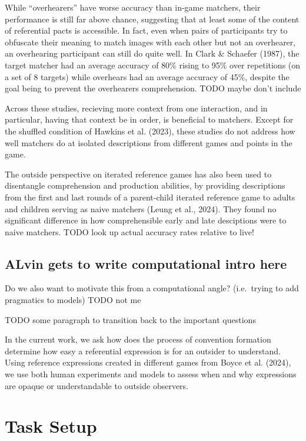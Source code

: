 \documentclass[10pt, letterpaper]{article}
\begin{document}
While ``overhearers'' have worse accuracy than in-game matchers, their
performance is still far above chance, suggesting that at least some of
the content of referential pacts is accessible. In fact, even when pairs
of participants try to obfuscate their meaning to match images with each
other but not an overhearer, an overhearing participant can still do
quite well. In Clark \& Schaefer (1987), the target matcher had an
average accuracy of 80\% rising to 95\% over repetitions (on a set of 8
targets) while overhears had an average accuracy of 45\%, despite the
goal being to prevent the overhearers comprehension. TODO maybe don't
include

Across these studies, recieving more context from one interaction, and
in particular, having that context be in order, is beneficial to
matchers. Except for the shuffled condition of Hawkins et al. (2023),
these studies do not address how well matchers do at isolated
descriptions from different games and points in the game.

The outside perspective on iterated reference games has also been used
to disentangle comprehension and production abilities, by providing
descriptions from the first and last rounds of a parent-child iterated
reference game to adults and children serving as naive matchers (Leung
et al., 2024). They found no significant difference in how
comprehensible early and late desciptions were to naive matchers. TODO
look up actual accuracy rates relative to live!

\subsection{ALvin gets to write computational intro
here}\label{alvin-gets-to-write-computational-intro-here}

Do we also want to motivate this from a computational angle?
(i.e.~trying to add pragmatics to models) TODO not me

TODO some paragraph to transition back to the important questions

In the current work, we ask how does the process of convention formation
determine how easy a referential expression is for an outsider to
understand. Using reference expressions created in different games from
Boyce et al. (2024), we use both human experiments and models to assess
when and why expressions are opaque or understandable to outside
observers.

\section{Task Setup}\label{task-setup}
\end{document}
